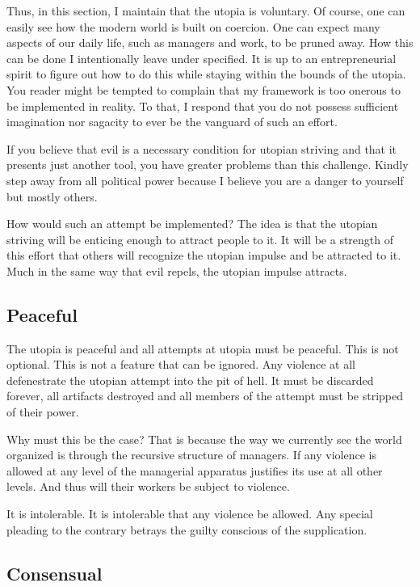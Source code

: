 \documentclass[12pt]{article}
\begin{document}
Thus, in this section, I maintain that the utopia is voluntary.
Of course, one can easily see how the modern world is built on coercion.
One can expect many aspects of our daily life, such as managers and work, to be pruned away.
How this can be done I intentionally leave under specified.
It is up to an entrepreneurial spirit to figure out how to do this while staying within the bounds of the utopia.
You reader might be tempted to complain that my framework is too onerous to be implemented in reality.
To that, I respond that you do not possess sufficient imagination nor sagacity to ever be the vanguard of such an effort.

If you believe that evil is a necessary condition for utopian striving and that it presents just another tool, you have greater problems than this challenge.
Kindly step away from all political power because I believe you are a danger to yourself but mostly others.

How would such an attempt be implemented?
The idea is that the utopian striving will be enticing enough to attract people to it.
It will be a strength of this effort that others will recognize the utopian impulse and be attracted to it.
Much in the same way that evil repels, the utopian impulse attracts.

\subsection{Peaceful}
The utopia is peaceful and all attempts at utopia must be peaceful.
This is not optional.
This is not a feature that can be ignored.
Any violence at all defenestrate the utopian attempt into the pit of hell.
It must be discarded forever, all artifacts destroyed and all members of the attempt must be stripped of their power.

Why must this be the case?
That is because the way we currently see the world organized is through the recursive structure of managers.
If any violence is allowed at any level of the managerial apparatus justifies its use at all other levels.
And thus will their workers be subject to violence.

It is intolerable.
It is intolerable that any violence be allowed.
Any special pleading to the contrary betrays the guilty conscious of the supplication.


\subsection{Consensual}
\end{document}
